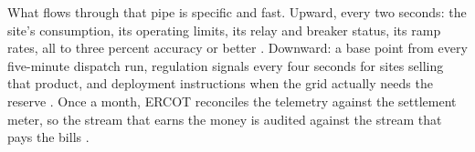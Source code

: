 What flows through that pipe is specific and fast. Upward, every two seconds: the site's consumption, its operating limits, its relay and breaker status, its ramp rates, all to three percent accuracy or better \autocite{ercoticcp2025,ercot2026protocols}. %
Downward: a base point from every five-minute dispatch run, regulation signals every four seconds for sites selling that product, and deployment instructions when the grid actually needs the reserve \autocite{ercot2026protocols,potomac2026somercot}. %
Once a month, ERCOT reconciles the telemetry against the settlement meter, so the stream that earns the money is audited against the stream that pays the bills \autocite{ercotnog2026}. %


